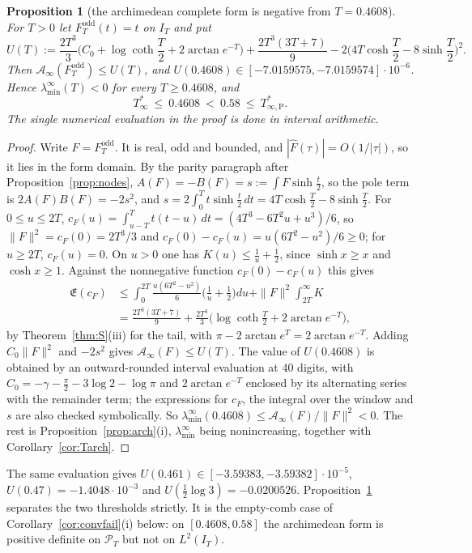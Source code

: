 \documentclass[11pt]{amsart}
\newtheorem{proposition}[theorem]{Proposition}
\theoremstyle{definition}
\theoremstyle{remark}
\newcommand{\PT}{\mathcal P_T}
\newcommand{\IT}{I_T}
\newcommand{\Fh}{\widehat F}
\newcommand{\cF}{c_F}
\newcommand{\Lev}{\mathfrak E}
\newcommand{\Ainf}{\mathcal A_\infty}
\newcommand{\laminf}{\lambda^{\infty}_{\min}}
\begin{document}
\begin{proposition}[the archimedean complete form is negative from $T=0.4608$]\label{prop:archneg}
For $T>0$ let $F^{\mathrm{odd}}_T(t)=t$ on $\IT$ and put
\[
U(T):=\frac{2T^3}3\Big(C_0+\log\coth\frac T2+2\arctan e^{-T}\Big)+\frac{2T^3(3T+7)}9
-2\Big(4T\cosh\frac T2-8\sinh\frac T2\Big)^2 .
\]
Then $\Ainf(F^{\mathrm{odd}}_T)\le U(T)$, and $U(0.4608)\in[-7.0159575,-7.0159574]\cdot10^{-6}$. Hence
$\laminf(T)<0$ for every $T\ge0.4608$, and
\[
T^*_\infty\ \le\ 0.4608\ <\ 0.58\ \le\ T^*_{\infty,\mathrm P} .
\]
The single numerical evaluation in the proof is done in interval arithmetic.
\end{proposition}
\begin{proof}
Write $F=F^{\mathrm{odd}}_T$. It is real, odd and bounded, and $|\Fh(\tau)|=O(1/|\tau|)$, so it lies in the
form domain. By the parity paragraph after Proposition~\ref{prop:nodes}, $A(F)=-B(F)=s:=\int F\sinh\frac t2$,
so the pole term is $2A(F)B(F)=-2s^2$, and $s=2\int_0^Tt\sinh\frac t2\,dt=4T\cosh\frac T2-8\sinh\frac T2$.
For $0\le u\le2T$, $\cF(u)=\int_{u-T}^Tt(t-u)\,dt=(4T^3-6T^2u+u^3)/6$, so $\|F\|^2=\cF(0)=2T^3/3$ and
$\cF(0)-\cF(u)=u(6T^2-u^2)/6\ge0$; for $u\ge2T$, $\cF(u)=0$. On $u>0$ one has $K(u)\le\frac1u+\frac12$,
since $\sinh x\ge x$ and $\cosh x\ge1$. Against the nonnegative function $\cF(0)-\cF(u)$ this gives
\begin{align*}
\Lev(\cF)&\le\int_0^{2T}\frac{u(6T^2-u^2)}6\Big(\frac1u+\frac12\Big)du+\|F\|^2\int_{2T}^\infty K\\
&=\frac{2T^3(3T+7)}9+\frac{2T^3}3\Big(\log\coth\frac T2+2\arctan e^{-T}\Big),
\end{align*}
by Theorem~\ref{thm:S}(iii) for the tail, with $\pi-2\arctan e^T=2\arctan e^{-T}$.
Adding $C_0\|F\|^2$ and $-2s^2$ gives $\Ainf(F)\le U(T)$. The value of $U(0.4608)$ is obtained by an
outward-rounded interval evaluation at $40$ digits, with $C_0=-\gamma-\frac\pi2-3\log2-\log\pi$ and
$2\arctan e^{-T}$ enclosed by its alternating series with the remainder term; the expressions for
$\cF$, the integral over the window and $s$ are also checked symbolically. So
$\laminf(0.4608)\le\Ainf(F)/\|F\|^2<0$. The rest is Proposition~\ref{prop:arch}(i), $\laminf$ being
nonincreasing, together with Corollary~\ref{cor:Tarch}.
\end{proof}
The same evaluation gives $U(0.461)\in[-3.59383,-3.59382]\cdot10^{-5}$, $U(0.47)=-1.4048\cdot10^{-3}$
and $U(\frac12\log3)=-0.0200526$. Proposition~\ref{prop:archneg} separates the two thresholds
strictly. It is the empty-comb case of Corollary~\ref{cor:convfail}(i) below: on $[0.4608,0.58]$ the
archimedean form is positive definite on $\PT$ but not on $L^2(\IT)$.
\end{document}
